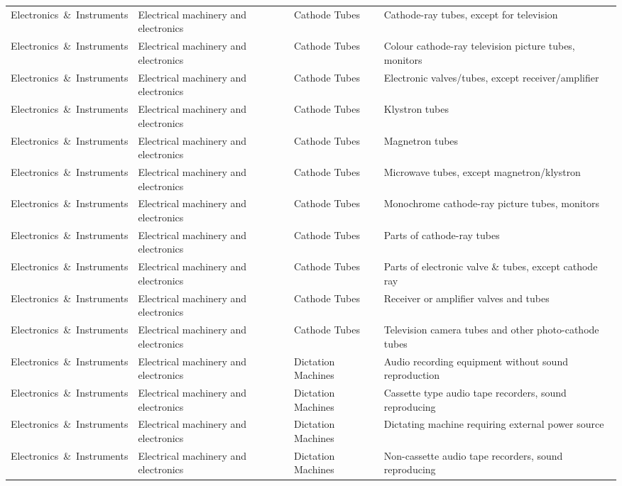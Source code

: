 \begin{appendices}
\begin{xltabular}{\textwidth}{|p{0.14\textwidth}|p{0.28\textwidth}|p{0.18\textwidth}|p{0.30\textwidth}|}
Electronics\ \&\ Instruments & Electrical machinery and electronics & Cathode Tubes & Cathode-ray tubes, except for television \\
Electronics\ \&\ Instruments & Electrical machinery and electronics & Cathode Tubes & Colour cathode-ray television picture tubes, monitors \\
Electronics\ \&\ Instruments & Electrical machinery and electronics & Cathode Tubes & Electronic valves/tubes, except receiver/amplifier \\
Electronics\ \&\ Instruments & Electrical machinery and electronics & Cathode Tubes & Klystron tubes \\
Electronics\ \&\ Instruments & Electrical machinery and electronics & Cathode Tubes & Magnetron tubes \\
Electronics\ \&\ Instruments & Electrical machinery and electronics & Cathode Tubes & Microwave tubes, except magnetron/klystron \\
Electronics\ \&\ Instruments & Electrical machinery and electronics & Cathode Tubes & Monochrome cathode-ray picture tubes, monitors \\
Electronics\ \&\ Instruments & Electrical machinery and electronics & Cathode Tubes & Parts of cathode-ray tubes \\
Electronics\ \&\ Instruments & Electrical machinery and electronics & Cathode Tubes & Parts of electronic valve \& tubes, except cathode ray \\
Electronics\ \&\ Instruments & Electrical machinery and electronics & Cathode Tubes & Receiver or amplifier valves and tubes \\
Electronics\ \&\ Instruments & Electrical machinery and electronics & Cathode Tubes & Television camera tubes and other photo-cathode tubes \\
Electronics\ \&\ Instruments & Electrical machinery and electronics & Dictation Machines & Audio recording equipment without sound reproduction \\
Electronics\ \&\ Instruments & Electrical machinery and electronics & Dictation Machines & Cassette type audio tape recorders, sound reproducing \\
Electronics\ \&\ Instruments & Electrical machinery and electronics & Dictation Machines & Dictating machine requiring external power source \\
Electronics\ \&\ Instruments & Electrical machinery and electronics & Dictation Machines & Non-cassette audio tape recorders, sound reproducing \\

\end{xltabular}
\end{appendices}
